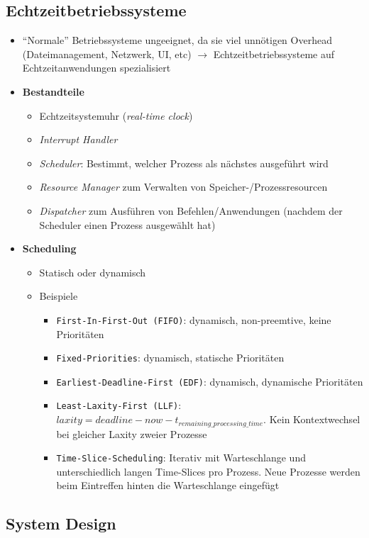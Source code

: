 \subsection{Echtzeitbetriebssysteme}
\begin{itemize}
	\item "`Normale"' Betriebssysteme ungeeignet, da sie viel unnötigen Overhead (Dateimanagement, Netzwerk, UI, etc) \(\rightarrow\) Echtzeitbetriebssysteme auf Echtzeitanwendungen spezialisiert
	\item \textbf{Bestandteile}
	\begin{itemize}
		\item Echtzeitsystemuhr (\textit{real-time clock})
		\item \textit{Interrupt Handler}
		\item \textit{Scheduler}: Bestimmt, welcher Prozess als nächstes ausgeführt wird
		\item \textit{Resource Manager} zum Verwalten von Speicher-/Prozessresourcen
		\item \textit{Dispatcher} zum Ausführen von Befehlen/Anwendungen (nachdem der Scheduler einen Prozess ausgewählt hat)
	\end{itemize}
	\item \textbf{Scheduling}
	\begin{itemize}
		\item Statisch oder dynamisch
		\item Beispiele
		\begin{itemize}
			\item \texttt{First-In-First-Out (FIFO)}: dynamisch, non-preemtive, keine Prioritäten
			\item \texttt{Fixed-Priorities}: dynamisch, statische Prioritäten
			\item \texttt{Earliest-Deadline-First (EDF)}: dynamisch, dynamische Prioritäten
			\item \texttt{Least-Laxity-First (LLF)}: \(laxity = deadline-now-t_{remaining\_processing\_time}\). Kein Kontextwechsel bei gleicher Laxity zweier Prozesse
			\item \texttt{Time-Slice-Scheduling}: Iterativ mit Warteschlange und unterschiedlich langen Time-Slices pro Prozess. Neue Prozesse werden beim Eintreffen hinten die Warteschlange eingefügt
		\end{itemize}
	\end{itemize}
\end{itemize}

\subsection{System Design}


